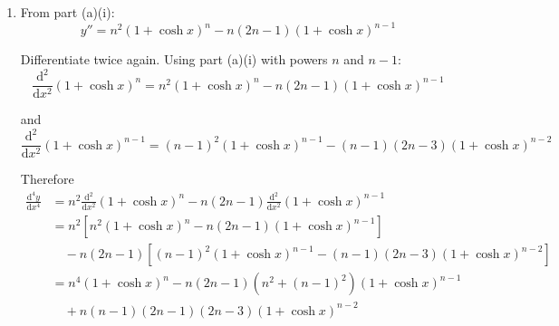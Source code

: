 \documentclass[leqno]{article}
\begin{document}
\begin{enumerate}[
  label=\textbf{\arabic*.},
  leftmargin=*,
  topsep=0pt,
  partopsep=0pt,
  parsep=0pt
]
\begin{djsSolution}
\begin{enumerate}[label=\textbf{(\alph*)}]
\begin{enumerate}[label=(\roman*)]
    Now use
    \[
    \sinh^2 x=\cosh^2 x-1=(\cosh x-1)(\cosh x+1)
    \]

    Substituting this gives
    \begin{align*}
    \frac{\mathrm{d}^2y}{\mathrm{d}x^2}
    &=n(n-1)(1+\cosh x)^{n-2}(\cosh x-1)(1+\cosh x)+n(1+\cosh x)^{n-1}\cosh x \\
    &=n(n-1)(1+\cosh x)^{n-1}(\cosh x-1)+n(1+\cosh x)^{n-1}\cosh x \\
    &=n(1+\cosh x)^{n-1}\left((n-1)(\cosh x-1)+\cosh x\right) \\
    &=n(1+\cosh x)^{n-1}\left(n\cosh x-(n-1)\right)
    \end{align*}

    Write
    \[
    n\cosh x=n(1+\cosh x)-n
    \]

    Then
    \[
    n\cosh x-(n-1)=n(1+\cosh x)-(2n-1)
    \]

    So
    \begin{align*}
    \frac{\mathrm{d}^2y}{\mathrm{d}x^2}
    &=n(1+\cosh x)^{n-1}\left(n(1+\cosh x)-(2n-1)\right) \\
    &=n^2(1+\cosh x)^n-n(2n-1)(1+\cosh x)^{n-1}
    \end{align*}

    \item From part (a)(i):
    \[
    y''=n^2(1+\cosh x)^n-n(2n-1)(1+\cosh x)^{n-1}
    \]

    Differentiate twice again. Using part (a)(i) with powers $n$ and $n-1$:
    \[
    \frac{\mathrm{d}^2}{\mathrm{d}x^2}(1+\cosh x)^n
    =n^2(1+\cosh x)^n-n(2n-1)(1+\cosh x)^{n-1}
    \]

    and
    \[
    \frac{\mathrm{d}^2}{\mathrm{d}x^2}(1+\cosh x)^{n-1}
    =(n-1)^2(1+\cosh x)^{n-1}-(n-1)(2n-3)(1+\cosh x)^{n-2}
    \]

    Therefore
    \begin{align*}
    \frac{\mathrm{d}^4y}{\mathrm{d}x^4}
    &=n^2\frac{\mathrm{d}^2}{\mathrm{d}x^2}(1+\cosh x)^n
    -n(2n-1)\frac{\mathrm{d}^2}{\mathrm{d}x^2}(1+\cosh x)^{n-1} \\
    &=n^2\left[n^2(1+\cosh x)^n-n(2n-1)(1+\cosh x)^{n-1}\right] \\
    &\quad -n(2n-1)\left[(n-1)^2(1+\cosh x)^{n-1}-(n-1)(2n-3)(1+\cosh x)^{n-2}\right] \\
    &=n^4(1+\cosh x)^n-n(2n-1)\left(n^2+(n-1)^2\right)(1+\cosh x)^{n-1} \\
    &\quad +n(n-1)(2n-1)(2n-3)(1+\cosh x)^{n-2}
    \end{align*}


\end{enumerate}
\end{enumerate}
\end{djsSolution}
\end{enumerate}
\end{document}
